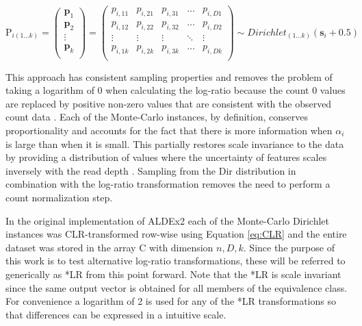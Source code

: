 \documentclass{bmcart}
\begin{document}
\begin{equation}
\textrm{P}_{i (1 \ldots k)}=
\begin{pmatrix}
    \boldsymbol{p}_1 \\
    \boldsymbol{p}_2 \\
    \vdots \\
    \boldsymbol{p}_k \\
\end{pmatrix} =
\begin{pmatrix}
    p_{i,11} & p_{i,21} & p_{i,31} & \dots  &  p_{i,D1}  \\
    p_{i,12} & p_{i,22} & p_{i,32} & \dots  &  p_{i,D2}  \\
    \vdots & \vdots & \vdots & \ddots &  \vdots  \\
    p_{i,1k} & p_{i,2k} & p_{i,3k} & \dots  & p_{i,Dk} \\
\end{pmatrix}
\sim Dirichlet_{(1 \ldots k)}( \boldsymbol{s}_i + 0.5)
\label{eq:matrix}
\end{equation}


This approach has consistent sampling properties and removes the problem of taking a logarithm of 0 when calculating the log-ratio because the count 0 values are replaced by positive non-zero values that are consistent with the observed count data \cite{fernandes:2013,gloorAJS:2016}. Each of the Monte-Carlo instances, by definition, conserves proportionality and accounts for the fact that there is more information when $\alpha_i$ is large than when it is small. This partially restores scale invariance to the data by providing a distribution of values where the uncertainty of  features scales inversely with the read depth \cite{fernandes:2013,gloorAJS:2016}. Sampling from the Dir distribution in combination with the log-ratio transformation removes the need to perform a count normalization step. 

In the original implementation of ALDEx2 each of the Monte-Carlo Dirichlet instances was CLR-transformed row-wise using Equation \ref{eq:CLR} and the entire dataset was stored in the array $\textrm{C}$ with dimension ${n,D,k}$. 
Since the purpose of this work is to test alternative log-ratio transformations, these will be referred to generically as *LR from this point forward. Note that the *LR  is scale invariant since the same output vector is obtained for all members of the equivalence class. For convenience a logarithm of 2 is used for any of the *LR transformations so that differences can be expressed in a intuitive scale.  
\end{document}
